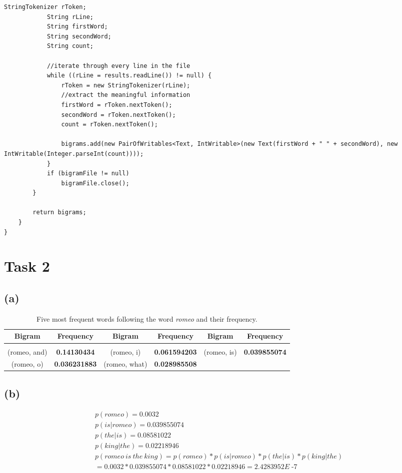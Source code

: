 \documentclass{article} %
\newcommand\dashseven{\operatorname{-7}}
\begin{document}
\begin{lstlisting}[style=Java]
			StringTokenizer rToken;
			String rLine;
			String firstWord;
			String secondWord;
			String count;

			//iterate through every line in the file
			while ((rLine = results.readLine()) != null) {
				rToken = new StringTokenizer(rLine);
				//extract the meaningful information
				firstWord = rToken.nextToken();
				secondWord = rToken.nextToken();
				count = rToken.nextToken();

				bigrams.add(new PairOfWritables<Text, IntWritable>(new Text(firstWord + " " + secondWord), new IntWritable(Integer.parseInt(count))));
			}
			if (bigramFile != null)
				bigramFile.close();
		}

		return bigrams;
	}
}
\end{lstlisting}

\section*{Task 2}

\subsection*{(a)}

\begin{table}[!htbp]
\caption{Five most frequent words following the word \textit{romeo} and their frequency.}
\label{table:3}
\begin{center}
\begin{tabular}{c c c c c c}
\multicolumn{1}{c}{\bf Bigram} & \multicolumn{1}{c}{\bf Frequency} & \multicolumn{1}{c}{\bf Bigram} & \multicolumn{1}{c}{\bf Frequency} &
\multicolumn{1}{c}{\bf Bigram} & \multicolumn{1}{c}{\bf Frequency}
\\ \hline \\
(romeo, and) & \textbf{0.14130434} & (romeo, i) & \textbf{0.061594203} & (romeo, is) & \textbf{0.039855074}\\
(romeo, o) & \textbf{0.036231883} & (romeo, what) & \textbf{0.028985508} & {} & {}\\

\end{tabular}
\end{center}
\end{table}

\subsection*{(b)}

\begin{gather*}
p(romeo) = 0.0032\\
p(is|romeo) = 0.039855074\\
p(the|is) = 0.08581022\\
p(king|the) = 0.02218946\\
p(romeo\ is\ the\ king) = p(romeo) * p(is|romeo) * p(the|is) * p(king|the)\\ = 0.0032 * 0.039855074 * 0.08581022 * 0.02218946 = 2.4283952E\dashseven
\end{gather*}
\end{document}
